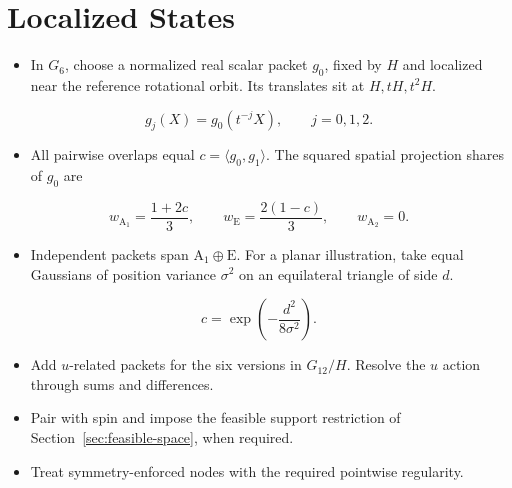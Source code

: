 \documentclass[12pt]{article}
\begin{document}
\section{Localized States}
\label{sec:localized-states}
\begin{itemize}
\item In $G_6$, choose a normalized real scalar packet $g_0$, fixed
by $H$ and localized near the reference rotational orbit.
Its translates sit at $H,tH,t^2H$.
\end{itemize}
\[
g_j(X)=g_0(t^{-j}X),\qquad j=0,1,2.
\]
\begin{itemize}
\item All pairwise overlaps equal $c=\langle g_0,g_1\rangle$.
The squared spatial projection shares of $g_0$ are
\end{itemize}
\[
w_{\mathrm A_1}=\frac{1+2c}{3},\qquad
w_{\mathrm E}=\frac{2(1-c)}{3},\qquad w_{\mathrm A_2}=0.
\]
\begin{itemize}
\item Independent packets span $\mathrm A_1\oplus\mathrm E$.
For a planar illustration, take equal Gaussians of position variance
$\sigma^2$ on an equilateral triangle of side $d$.
\end{itemize}
\[
c=\exp\!\left(-\frac{d^2}{8\sigma^2}\right).
\]
\begin{itemize}
\item Add $u$-related packets for the six versions in $G_{12}/H$.
Resolve the $u$ action through sums and differences.
\item Pair with spin and impose the feasible support restriction
of Section~\ref{sec:feasible-space}, when required.
\item Treat symmetry-enforced nodes with the required pointwise regularity.
\end{itemize}

\end{document}
